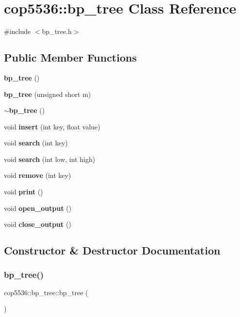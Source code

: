 \section{cop5536\+::bp\+\_\+tree Class Reference}
\label{classcop5536_1_1bp__tree}


{\ttfamily \#include $<$bp\+\_\+tree.\+h$>$}

\subsection*{Public Member Functions}
\begin{DoxyCompactItemize}
\item 
\textbf{ bp\+\_\+tree} ()
\item 
\textbf{ bp\+\_\+tree} (unsigned short m)
\item 
\textbf{ $\sim$bp\+\_\+tree} ()
\item 
void \textbf{ insert} (int key, float value)
\item 
void \textbf{ search} (int key)
\item 
void \textbf{ search} (int low, int high)
\item 
void \textbf{ remove} (int key)
\item 
void \textbf{ print} ()
\item 
void \textbf{ open\+\_\+output} ()
\item 
void \textbf{ close\+\_\+output} ()
\end{DoxyCompactItemize}


\subsection{Constructor \& Destructor Documentation}
\mbox{\label{classcop5536_1_1bp__tree_a8f2aa475cf2dccb634015fb983fe8b33}} 
\subsubsection{bp\_tree()\hspace{0.1cm}{\footnotesize\ttfamily [1/2]}}
{\footnotesize\ttfamily cop5536\+::bp\+\_\+tree\+::bp\+\_\+tree (\begin{DoxyParamCaption}{ }\end{DoxyParamCaption})\hspace{0.3cm}{\ttfamily [inline]}}

